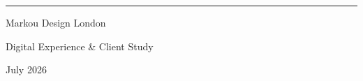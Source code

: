 \documentclass[10.5pt,a4paper]{article}
\begin{document}
\vfill
\begin{center}
  {\color{MarkouStone}\rule{24mm}{1pt}}\par
  \vspace{5mm}
  {\DisplayFont\fontsize{23}{27}\selectfont Markou Design London}\par
  \vspace{2mm}
  {\small\color{MarkouMuted}Digital Experience \& Client Study}\par
  \vspace{7mm}
  {\scriptsize\bfseries{}}\par
  \vspace{2mm}
  {\scriptsize\color{MarkouMuted}July 2026}
\end{center}
\end{document}
